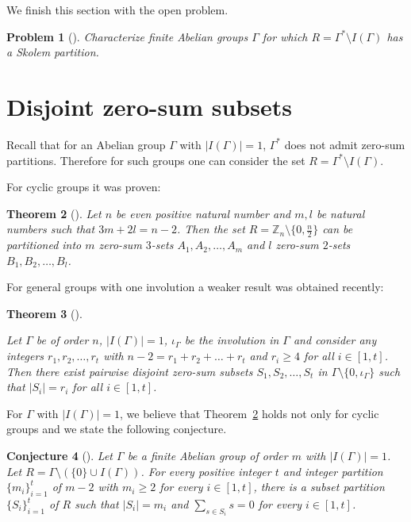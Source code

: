 \documentclass{article}
\newcommand{\zet}{\mathbb{Z}}
\newtheorem{thm}{Theorem}[section]
\newtheorem{prob}[thm]{Problem}
\newtheorem{conj}[thm]{Conjecture}
\begin{document}
We finish this section with the open problem.
\begin{prob}[\cite{CicrSuch2}]\label{conjectureSK}Characterize finite Abelian groups $\Gamma$ for which $R =\Gamma^* \setminus I(\Gamma)$ has a Skolem partition.
\end{prob}

\section{Disjoint zero-sum subsets}
Recall that for an Abelian group $\Gamma$ with $|I(\Gamma)|=1$, $\Gamma^*$ does not admit zero-sum partitions. Therefore for such groups one can consider the set $R=\Gamma^*\setminus I(\Gamma)$.

For  cyclic groups it was proven:
\begin{thm}[\cite{Tannenbaum1,Zeng}]\label{Zeng2}
{Let} $n$ be even positive natural number and  $m,l$ be natural numbers such that $3m+2l = n-2$. Then the set $R=\zet_n\setminus\{0,\frac{n}{2}\}$ can be partitioned into $m$ zero-sum $3$-sets $A_1,A_2,\ldots,A_{m}$ and $l$ zero-sum $2$-sets $B_1,B_2,\ldots,B_l$.  
\end{thm}

For general groups with one involution a weaker result was obtained recently:
\begin{thm}[\cite{Cicir}]   \label{zero-sum}

Let $\Gamma$ be of order\/ $n$, $|I(\Gamma)|=1$, $\iota_{\Gamma}$ be the involution in $\Gamma$ and consider any integers\/
 $r_1,r_2,\dots,r_t$ with\/ $n -2=r_1 + r_2 + \ldots + r_t$
  and {$r_i \geq 4$} for all\/ $i\in[1,t]$.
Then
 there exist pairwise disjoint zero-sum subsets\/ $S_1, S_2,\ldots , S_t$ in\/ $\Gamma\setminus\{0,\iota_{\Gamma}\}$
 such that\/ $|S_i| = r_i$ for all\/ $i\in[1,t]$.
\end{thm}
 For $\Gamma$ with $|I(\Gamma)|=1$, we believe that Theorem~\ref{Zeng2} holds not only for cyclic groups and we state the following conjecture.


\begin{conj}[\cite{Cicir}]\label{moja}
Let $\Gamma$ be a finite Abelian group of order $m$ with $|I(\Gamma)|=1$. Let $R =\Gamma \setminus(\{0\}\cup I(\Gamma))$. For every positive integer $t$ and integer partition $\{m_i\}_{i=1}^t$ of $m-2$ with $m_i \geq 2$ for every $i\in[1,t]$, there is a subset partition $\{S_i\}_{i=1}^t$ of $R$ such that $|S_i| = m_i$ and $\sum_{s\in S_i}s = 0$ for every $i\in[1,t]$. \end{conj}
\end{document}
